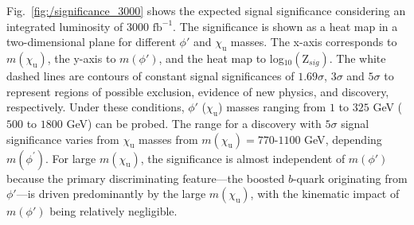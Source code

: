 Fig.~\ref{fig:/significance_3000} shows the expected signal significance considering an integrated luminosity of $3000$ $\mathrm{fb^{-1}}$. The significance is shown as a heat map in a two-dimensional plane for different $\phi'$ and $\chi_{\mathrm{u}}$ masses. The x-axis corresponds to $m(\chi_\mathrm{u})$, the y-axis to $m(\phi')$, and the heat map to log$_{10}(\mathrm{Z}_{sig})$. The white dashed lines are contours of constant signal significances of $1.69 \sigma$,  $3\sigma$ and  $5\sigma$ to represent regions of possible exclusion, evidence of new physics, and discovery, respectively. Under these conditions, $\phi'$ ($\chi_{\mathrm{u}}$) masses ranging from $1$ to $325$ \textrm{GeV} ($500$ to $1800$ \textrm{GeV}) can be probed. The range for a discovery with $5\sigma$ signal significance varies from $\chi_{\mathrm{u}}$ masses from $m(\chi_{\mathrm{u}}) = 770$-$1100$ \textrm{GeV}, depending  $m(\phi^{'})$. For large $m(\chi_\mathrm{u})$, the significance is almost independent of $m(\phi')$ because the primary discriminating feature—the boosted $b$-quark originating from $\phi'$—is driven predominantly by the large $m(\chi_\mathrm{u})$, with the kinematic impact of $m(\phi')$ being relatively negligible.


